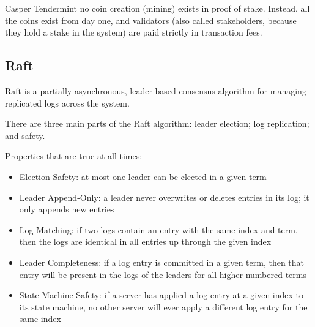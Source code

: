 Casper
Tendermint
no coin creation (mining) exists in proof of stake. Instead, all the coins exist from day one, and validators (also called stakeholders, because they hold a stake in the system) are paid strictly in transaction fees.




\subsection{Raft}
Raft is a partially asynchronous, leader based consensus algorithm for managing replicated logs across the system. 

There are three main parts of the Raft algorithm: leader election; log replication; and safety. 

Properties that are true at all times: %
\begin{itemize}
\item Election Safety: at most one leader can be elected in a given term
\item Leader Append-Only: a leader never overwrites or deletes entries in its log; it only appends new entries
\item Log Matching: if two logs contain an entry with the same index and term, then the logs are identical in all entries up through the given index
\item Leader Completeness: if a log entry is committed in a given term, then that entry will be present in the logs of the leaders for all higher-numbered terms
\item State Machine Safety: if a server has applied a log entry at a given index to its state machine, no other server will ever apply a different log entry for the same index
\end{itemize}

